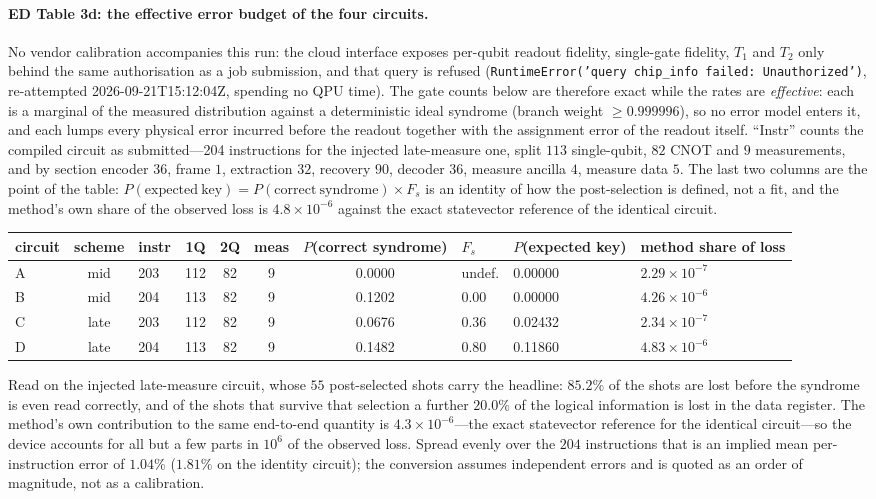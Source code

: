 \documentclass[10pt,a4paper]{article}
\begin{document}
\paragraph*{ED Table 3d: the effective error budget of the four circuits.}
No vendor calibration accompanies this run: the cloud interface exposes per-qubit
readout fidelity, single-gate fidelity, $T_1$ and $T_2$ only behind the same
authorisation as a job submission, and that query is refused (\texttt{RuntimeError('query chip\_info failed: Unauthorized')},
re-attempted 2026-09-21T15:12:04Z, spending no QPU time).  The gate counts below are therefore exact
while the rates are \emph{effective}: each is a marginal of the measured
distribution against a deterministic ideal syndrome (branch weight $\ge0.999996$), so
no error model enters it, and each lumps every physical error incurred before the
readout together with the assignment error of the readout itself.  ``Instr'' counts
the compiled circuit as submitted---204 instructions for the injected late-measure
one, split $113$ single-qubit, $82$ CNOT and $9$ measurements, and by section encoder $36$, frame $1$, extraction $32$, recovery $90$, decoder $36$, measure ancilla $4$, measure data $5$.
The last two columns are the point of the table:
$P(\mathrm{expected\ key}) = P(\mathrm{correct\ syndrome})\times F_s$ is an
identity of how the post-selection is defined, not a fit, and the method's own
share of the observed loss is $4.8\times 10^{-6}$ against the exact statevector reference of the
identical circuit.
\begin{longtable}{lclcccclll}
\toprule circuit & scheme & instr & 1Q & 2Q & meas & $P$(correct syndrome) & $F_s$ & $P$(expected key) & method share of loss \\ \midrule
A & mid & 203 & 112 & 82 & 9 & 0.0000 & undef. & 0.00000 & $2.29\times 10^{-7}$ \\
B & mid & 204 & 113 & 82 & 9 & 0.1202 & 0.00 & 0.00000 & $4.26\times 10^{-6}$ \\
C & late & 203 & 112 & 82 & 9 & 0.0676 & 0.36 & 0.02432 & $2.34\times 10^{-7}$ \\
D & late & 204 & 113 & 82 & 9 & 0.1482 & 0.80 & 0.11860 & $4.83\times 10^{-6}$ \\
\bottomrule\end{longtable}

\vspace{4pt}\noindent Read on the injected late-measure circuit, whose $55$
post-selected shots carry the headline: $85.2\%$ of the shots are lost before the
syndrome is even read correctly, and of the shots that survive that selection a
further $20.0\%$ of the logical information is lost in the data register.  The
method's own contribution to the same end-to-end quantity is $4.3\times 10^{-6}$---the exact
statevector reference for the identical circuit---so the device accounts for all
but a few parts in $10^{6}$ of the observed loss.  Spread evenly over the $204$
instructions that is an implied mean per-instruction error of $1.04\%$
($1.81\%$ on the identity circuit); the conversion assumes independent errors and
is quoted as an order of magnitude, not as a calibration.
\end{document}
